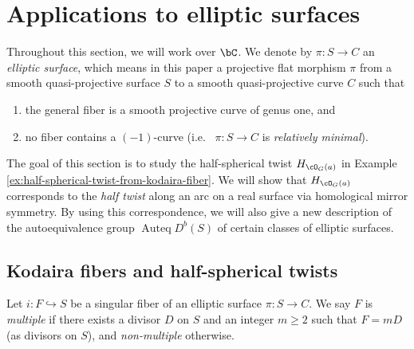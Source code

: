 \documentclass{amsart}
\numberwithin{equation}{section}
\theoremstyle{plain}
\theoremstyle{definition}
\DeclareMathOperator{\Auteq}{\mathrm{Auteq}}
\begin{document}
\section{Applications to elliptic surfaces}\label{section:applications-to-elliptic-surfaces}
Throughout this section, we will work over $\bC$.
We denote by $\pi \colon S \to C$ an \emph{elliptic surface}, which means in this paper a projective flat morphism $\pi$ from a smooth quasi-projective surface $S$ to a smooth quasi-projective curve $C$ such that
\begin{enumerate}
    \item the general fiber is a smooth projective curve of genus one, and
    \item no fiber contains a $(-1)$-curve (i.e.~ $\pi \colon S \to C$ is \emph{relatively minimal}).
\end{enumerate}

The goal of this section is to study the half-spherical twist $H_{\cO_G(a)}$ in Example \ref{ex:half-spherical-twist-from-kodaira-fiber}.
We will show that $H_{\cO_G(a)}$ corresponds to the \emph{half twist} along an arc on a real surface via homological mirror symmetry.
By using this correspondence, we will also give a new description of the autoequivalence group $\Auteq D^b(S)$ of certain classes of elliptic surfaces.

\subsection{Kodaira fibers and half-spherical twists}
Let $i \colon F \hookrightarrow S$ be a singular fiber of an elliptic surface $\pi \colon S \to C$.
We say $F$ is \emph{multiple} if there exists a divisor $D$ on $S$ and an integer $m \geq 2$ such that $F = mD$ (as divisors on $S$), and \emph{non-multiple} otherwise.
\end{document}
